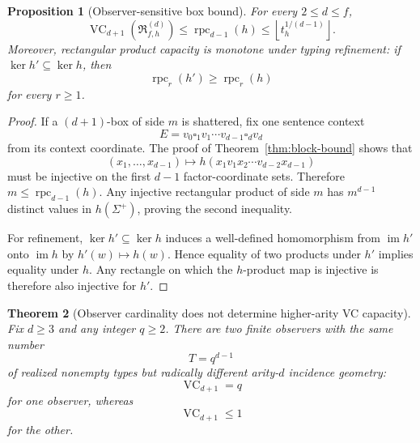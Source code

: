 \documentclass[11pt]{article}
\newtheorem{theorem}{Theorem}[section]
\newtheorem{proposition}[theorem]{Proposition}
\newcommand{\Rclass}{\mathfrak R}
\newcommand{\VC}{\operatorname{VC}}
\newcommand{\blank}{\square}
\begin{document}
\begin{proposition}[Observer-sensitive box bound]
\label{prop:rpc-bound}
For every \(2\le d\le f\),
\[
 \VC_{d+1}\!\left(\Rclass_{f,h}^{(d)}\right)
 \le \operatorname{rpc}_{d-1}(h)
 \le \left\lfloor t_h^{1/(d-1)}\right\rfloor.
\]
Moreover, rectangular product capacity is monotone under typing refinement:
if \(\ker h'\subseteq\ker h\), then
\[
 \operatorname{rpc}_r(h')\ge\operatorname{rpc}_r(h)
\]
for every \(r\ge1\).
\end{proposition}

\begin{proof}
If a \((d+1)\)-box of side \(m\) is shattered, fix one sentence context
\[
 E=v_0\blank_1v_1\cdots v_{d-1}\blank_dv_d
\]
from its context coordinate. The proof of
Theorem~\ref{thm:block-bound} shows that
\[
 (x_1,\ldots,x_{d-1})\longmapsto
 h(x_1v_1x_2\cdots v_{d-2}x_{d-1})
\]
must be injective on the first \(d-1\) factor-coordinate sets. Therefore
\(m\le\operatorname{rpc}_{d-1}(h)\). Any injective rectangular product of
side \(m\) has \(m^{d-1}\) distinct values in \(h(\Sigma^+)\), proving the
second inequality.

For refinement, \(\ker h'\subseteq\ker h\) induces a well-defined
homomorphism from \(\operatorname{im}h'\) onto \(\operatorname{im}h\) by
\(h'(w)\mapsto h(w)\). Hence equality of two products under \(h'\) implies
equality under \(h\). Any rectangle on which the \(h\)-product map is
injective is therefore also injective for \(h'\).
\end{proof}

\begin{theorem}[Observer cardinality does not determine higher-arity VC capacity]
\label{thm:same-size-observers}
Fix \(d\ge3\) and any integer \(q\ge2\). There are two finite observers
with the same number
\[
 T=q^{d-1}
\]
of realized nonempty types but radically different arity-\(d\) incidence
geometry:
\[
 \VC_{d+1}=q
\]
for one observer, whereas
\[
 \VC_{d+1}\le1
\]
for the other.
\end{theorem}
\end{document}
